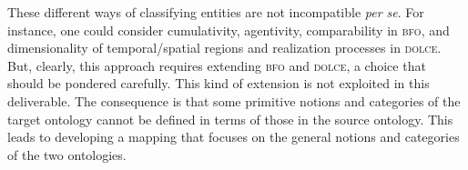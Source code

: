 \documentclass[ao]{iosart2x}
\newcommand{\bflist}{\begin{list}{}{\setlength{\topsep}{2mm}\setlength{\parsep}{0mm}\setlength{\leftmargin}{9.2mm}\setlength{\labelwidth}{8mm}}}
\newcommand{\bfoAxLabel}{\textrm{a$_\texttt{b}$}}
\newcommand{\bfoThrLabel}{\textrm{t$_\texttt{b}$}}
\newcommand{\dbAxLabel}{\textrm{a}$_\texttt{db}$}
\newcommand{\refbfoax}[1]{({\bfoAxLabel}\ref{#1})}
\newcommand{\refbfoth}[1]{({\bfoThrLabel}\ref{#1})}
\newcommand{\refdbax}[1]{({\dbAxLabel}\ref{#1})}
\newcommand{\dolce}{{\textsc{dolce}}}
\newcommand{\bfo}{{\textsc{bfo}}}
\newcommand {\thbfo} {\ensuremath{\mathfrak{B}}}
\newcommand{\bfoiof}[1]{{\,::_{#1\:\!}}}
\begin{document}
\smallskip
These different ways of classifying entities are not incompatible \textit{per se}. For instance, one could consider cumulativity, agentivity, comparability in {\bfo}, and dimensionality of temporal/spatial regions and realization processes in {\dolce}. But, clearly, this approach requires extending {\bfo} and {\dolce}, a choice that should be pondered carefully. This kind of extension is not exploited in this deliverable. The consequence is that some primitive notions and categories of the target ontology cannot be defined in terms of those in the source ontology. This leads to developing a mapping that focuses on the general notions and categories of the two ontologies.
   





%


%
%
%
%




\end{document}
